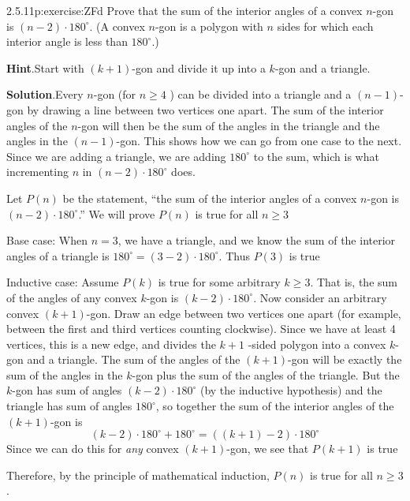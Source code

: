 \documentclass[twoside,11pt,]{book}
\newcommand{\blocktitlefont}{\relax}
\numberwithin{equation}{chapter}
\begin{document}
\begin{divisionsolution}{2.5.11}{}{p:exercise:ZFd}%
Prove that the sum of the interior angles of a convex \(n\)-gon is \((n-2)\cdot 180^\circ\). (A convex \(n\)-gon is a polygon with \(n\) sides for which each interior angle is less than \(180^\circ\).)%
\par\smallskip%
\noindent\textbf{\blocktitlefont Hint}.\quad{}Start with \((k+1)\)-gon and divide it up into a \(k\)-gon and a triangle.%
\par\smallskip%
\noindent\textbf{\blocktitlefont Solution}.\quad{}Every \(n\)-gon (for \(n \ge 4\) ) can be divided into a triangle and a \((n-1)\)-gon by drawing a line between two vertices one apart. The sum of the interior angles of the \(n\)-gon will then be the sum of the angles in the triangle and the angles in the \((n-1)\)-gon. This shows how we can go from one case to the next. Since we are adding a triangle, we are adding \(180^\circ\) to the sum, which is what incrementing \(n\) in \((n-2)\cdot 180^\circ\) does.%
\begin{solutionproof}
Let \(P(n)\) be the statement, ``the sum of the interior angles of a convex \(n\)-gon is \((n-2)\cdot 180^\circ\).'' We will prove \(P(n)\) is true for all \(n \ge 3\)%
\par
Base case: When \(n=3\), we have a triangle, and we know the sum of the interior angles of a triangle is \(180^\circ = (3-2)\cdot 180^\circ\). Thus \(P(3)\) is true%
\par
Inductive case: Assume \(P(k)\) is true for some arbitrary \(k \ge 3\). That is, the sum of the angles of any convex \(k\)-gon is \((k-2)\cdot 180^\circ\). Now consider an arbitrary convex \((k+1)\)-gon. Draw an edge between two vertices one apart (for example, between the first and third vertices counting clockwise). Since we have at least 4 vertices, this is a new edge, and divides the \(k+1\) -sided polygon into a convex \(k\)-gon and a triangle. The sum of the angles of the \((k+1)\)-gon will be exactly the sum of the angles in the \(k\)-gon plus the sum of the angles of the triangle. But the \(k\)-gon has sum of angles \((k-2)\cdot 180^\circ\) (by the inductive hypothesis) and the triangle has sum of angles \(180^\circ\), so together the sum of the interior angles of the \((k+1)\)-gon is%
\begin{equation*}
(k-2)\cdot 180^\circ + 180^\circ = ((k+1)-2)\cdot 180^\circ
\end{equation*}
Since we can do this for \emph{any} convex \((k+1)\)-gon, we see that \(P(k+1)\) is true%
\par
Therefore, by the principle of mathematical induction, \(P(n)\) is true for all \(n\ge 3\).%
\end{solutionproof}
\end{divisionsolution}%
\end{document}
